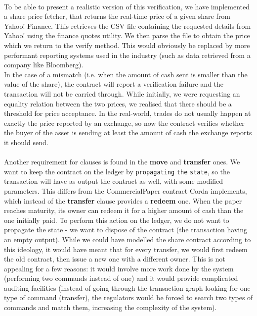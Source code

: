 \documentclass[12pt,twoside]{article}
\begin{document}
\\

To be able to present a realistic version of this verification, we have implemented a share price fetcher, that returns the real-time price of a given share from Yahoo! Finance. This retrieves the CSV file containing the requested details from Yahoo! using the finance quotes utility. We then parse the file to obtain the price which we return to the verify method. This would obviously be replaced by more performant reporting systems used in the industry (such as data retrieved from a company like Bloomberg). 
\\
In the case of a mismatch (i.e. when the amount of cash sent is smaller than the value of the share), the contract will report a verification failure and the transaction will not be carried through. While initially, we were requesting an equality relation between the two prices, we realised that there should be a threshold for price acceptance. In the real-world, trades do not usually happen at exactly the price reported by an exchange, so now the contract verifies whether the buyer of the asset is sending at least the amount of cash the exchange reports it should send.
\\ \\
Another requirement for clauses is found in the \textbf{move} and \textbf{transfer} ones. We want to keep the contract on the ledger by \verb|propagating| \verb|the| \verb|state|, so the transaction will have as output the contract as well, with some modified parameters. This differs from the CommercialPaper contract Corda implements, which instead of the \textbf{transfer} clause provides a \textbf{redeem} one. When the paper reaches maturity, its owner can redeem it for a higher amount of cash than the one initially paid. To perform this action on the ledger, we do not want to propagate the state - we want to dispose of the contract (the transaction having an empty output). While we could have modelled the share contract according to this ideology, it would have meant that for every transfer, we would first redeem the old contract, then issue a new one with a different owner. This is not appealing for a few reasons: it would involve more work done by the system (performing two commands instead of one) and it would provide complicated auditing facilities (instead of going through the transaction graph looking for one type of command (transfer), the regulators would be forced to search two types of commands and match them, increasing the complexity of the system).
\end{document}
